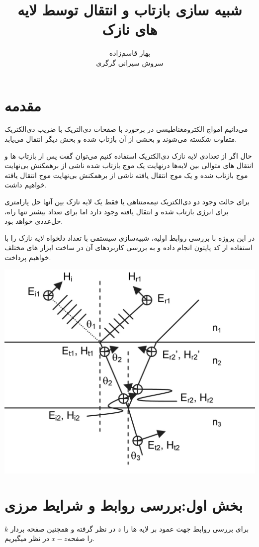 \documentclass{article}
\title{شبیه سازی بازتاب و انتقال توسط لایه های نازک}
\author{بهار قاسم‌زاده\\
سروش سیرانی گرگری}
\date{}
\begin{document}
	\maketitle
	\newpage
	
	\section*{مقدمه}
	
	می‌دانیم امواج الکترومغناطیسی در برخورد با صفحات دی‌التریک با ضریب دی‌الکتریک متفاوت شکسته می‌شوند و بخشی از آن بازتاب شده و بخش دیگر انتقال می‌یابد.
	
	
	حال اگر از تعدادی لایه نازک دی‌الکتریک استفاده کنیم می‌توان گفت پس از بازتاب ها و انتقال های متوالی بین لایه‌ها درنهایت یک موج بازتاب شده ناشی از برهمکنش بی‌نهایت موج بازتاب شده و یک موج انتقال یافته ناشی از برهمکنش بی‌نهایت موج انتقال یافته خواهیم داشت.
	
	
	برای حالت وجود دو دی‌الکتریک نیمه‌متناهی یا فقط یک لایه نازک بین آنها حل پارامتری برای انرژی بازتاب شده و انتقال یافته وجود دارد اما برای تعداد بیشتر تنها راه، حل‌عددی خواهد بود.
	
	
	در این پروژه با بررسی روابط اولیه، شبیه‌سازی سیستمی با تعداد دلخواه لایه نازک را با استفاده از کد پایتون انجام داده و به بررسی کاربرد‌های آن در ساخت ابزار های مختلف خواهیم پرداخت. 
	
	\newpage
	
	
	\begin{center}
		\includegraphics[height=.45\linewidth]{image2}
	\end{center}
	
	\section*{بخش اول:بررسی روابط و شرایط مرزی} 
	
	برای بررسی روابط جهت عمود بر لایه ها را $z$ در نظر گرفته و همچنین صفحه بردار $k$ را صفحه$x-z$ در نظر میگیریم.
	
\end{document}
